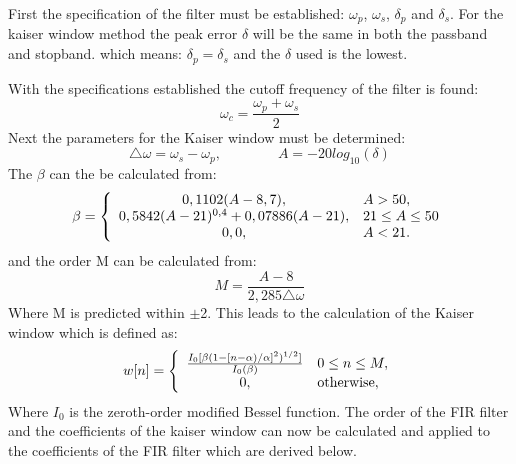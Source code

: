 First the specification of the filter must be established: $\omega_p$, $\omega_s$, $\delta_p$ and $\delta_s$. For the kaiser window method the peak error $\delta$ will be the same in both the passband and stopband. which means: $\delta_p = \delta_s$ and the $\delta$ used is the lowest.

With the specifications established the cutoff frequency of the filter is found:
\begin{equation}
\omega_c=\frac{\omega_p+\omega_s}{2}
\end{equation}
Next the parameters for the Kaiser window must be determined:
\begin{equation}
\triangle\omega = \omega_s-\omega_p, \qquad\qquad A=-20log_{10}(\delta)
\end{equation}
The $\beta$ can the be calculated from:
\begin{equation} \label{eq:beta}
\beta=\left\{
\begin{array}{c l}      
    0,1102(A-8,7), & A>50,\\
    0,5842(A-21)^{0,4}+0,07886(A-21), & 21\leq A\leq 50\\
    0,0, & A<21.
\end{array}\right.
\end{equation}
and the order M can be calculated from:
\begin{equation}
M=\frac{A-8}{2,285\triangle\omega}
\end{equation}
Where M is predicted within $\pm$2. This leads to the calculation of the Kaiser window which is defined as:
\begin{equation} \label{eq:kaiserwindow}
w[n]=\left\{
\begin{array}{c l}      
    \frac{I_0[\beta(1-[n-\alpha)/\alpha]^2)^{1/2}]}{I_0(\beta)} & 0\leq n\leq M,\\
    0, & \textrm{otherwise},
\end{array}\right.
\end{equation}
Where $I_0$ is the zeroth-order modified Bessel function. The order of the FIR filter and the coefficients of the kaiser window can now be calculated and applied to the coefficients of the FIR filter which are derived below.

